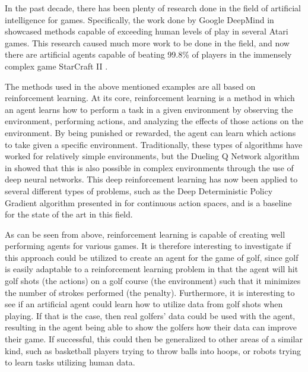 \documentclass{kththesis}
\begin{document}
In the past decade, there has been plenty of research done in the field of artificial intelligence for games. Specifically, the work done by Google DeepMind in \textcite{mnih2015human} showcased methods capable of exceeding human levels of play in several Atari games. This research caused much more work to be done in the field, and now there are artificial agents capable of beating 99.8\% of players in the immensely complex game StarCraft II \parencite{vinyals2019grandmaster}. 

The methods used in the above mentioned examples are all based on reinforcement learning. At its core, reinforcement learning is a method in which an agent learns how to perform a task in a given environment by observing the environment, performing actions, and analyzing the effects of those actions on the environment. By being punished or rewarded, the agent can learn which actions to take given a specific environment. Traditionally, these types of algorithms have worked for relatively simple environments, but the Dueling Q Network algorithm in \textcite{mnih2015human} showed that this is also possible in complex environments through the use of deep neural networks. This deep reinforcement learning has now been applied to several different types of problems, such as the Deep Deterministic Policy Gradient algorithm presented in \textcite{lillicrap2015continuous} for continuous action spaces, and is a baseline for the state of the art in this field.

As can be seen from above, reinforcement learning is capable of creating well performing agents for various games. It is therefore interesting to investigate if this approach could be utilized to create an agent for the game of golf, since golf is easily adaptable to a reinforcement learning problem in that the agent will hit golf shots (the actions) on a golf course (the environment) such that it minimizes the number of strokes performed (the penalty). Furthermore, it is interesting to see if an artificial agent could learn how to utilize data from golf shots when playing. If that is the case, then real golfers' data could be used with the agent, resulting in the agent being able to show the golfers how their data can improve their game. If successful, this could then be generalized to other areas of a similar kind, such as basketball players trying to throw balls into hoops, or robots trying to learn tasks utilizing human data.
\end{document}

